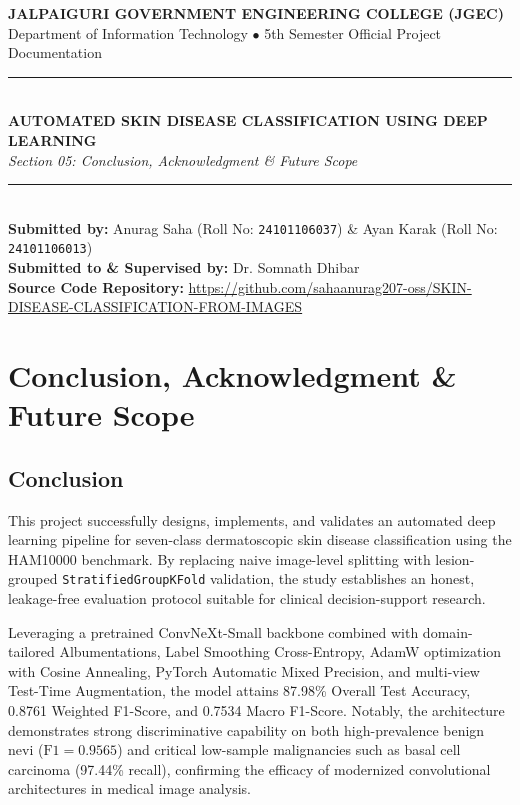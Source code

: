 \documentclass[12pt,a4paper]{article}
\begin{document}
\begin{center}
    {\Large \textbf{\color{primary} JALPAIGURI GOVERNMENT ENGINEERING COLLEGE (JGEC)}}\\[0.3em]
    {\normalsize Department of Information Technology $\bullet$ 5th Semester Official Project Documentation}\\[1em]
    \rule{\linewidth}{1.5pt}\\[0.5em]
    {\LARGE \textbf{AUTOMATED SKIN DISEASE CLASSIFICATION USING DEEP LEARNING}}\\[0.3em]
    {\large \textit{Section 05: Conclusion, Acknowledgment \& Future Scope}}\\[0.3em]
    \rule{\linewidth}{1.5pt}\\[0.8em]
    \textbf{Submitted by:} Anurag Saha (Roll No: \texttt{24101106037}) \& Ayan Karak (Roll No: \texttt{24101106013})\\[0.3em]
    \textbf{Submitted to \& Supervised by:} Dr. Somnath Dhibar\\[0.3em]
    \textbf{Source Code Repository:} \url{https://github.com/sahaanurag207-oss/SKIN-DISEASE-CLASSIFICATION-FROM-IMAGES}
\end{center}

\vspace{0.8em}

\section{Conclusion, Acknowledgment \& Future Scope}
\subsection{Conclusion}
This project successfully designs, implements, and validates an automated deep learning pipeline for seven-class dermatoscopic skin disease classification using the HAM10000 benchmark. By replacing naive image-level splitting with lesion-grouped \texttt{StratifiedGroupKFold} validation, the study establishes an honest, leakage-free evaluation protocol suitable for clinical decision-support research.

Leveraging a pretrained ConvNeXt-Small backbone combined with domain-tailored Albumentations, Label Smoothing Cross-Entropy, AdamW optimization with Cosine Annealing, PyTorch Automatic Mixed Precision, and multi-view Test-Time Augmentation, the model attains 87.98\% Overall Test Accuracy, 0.8761 Weighted F1-Score, and 0.7534 Macro F1-Score. Notably, the architecture demonstrates strong discriminative capability on both high-prevalence benign nevi ($\text{F1} = 0.9565$) and critical low-sample malignancies such as basal cell carcinoma (97.44\% recall), confirming the efficacy of modernized convolutional architectures in medical image analysis.
\end{document}
